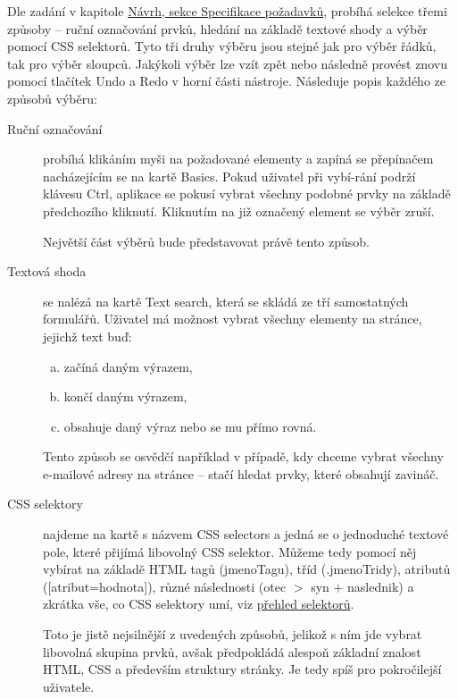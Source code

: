 \documentclass[thesis=B,czech]{FITthesis}[2012/06/26]
\begin{document}
Dle zadání v kapitole \hyperref[sec:requirements_specification]{Návrh, sekce Specifikace požadavků}, probíhá selekce třemi způsoby -- ruční označování prvků, hledání na základě textové shody a výběr pomocí CSS selektorů. Tyto tři druhy výběru jsou stejné jak pro výběr řádků, tak pro výběr sloupců. Jakýkoli výběr lze vzít zpět nebo následně provést znovu pomocí tlačítek \textsf{Undo} a \textsf{Redo} v horní části nástroje. Následuje popis každého ze způsobů výběru:
\begin{description}
	\item[Ruční označování] probíhá klikáním myši na požadované elementy a zapíná se přepínačem nacházejícím se na kartě \textsf{Basics}. Pokud uživatel při vybí-rání podrží klávesu \textsf{Ctrl}, aplikace se pokusí vybrat všechny podobné prvky na základě předchozího kliknutí. Kliknutím na již označený element se výběr zruší.
	
	Největší část výběrů bude představovat právě tento způsob.
	\item [Textová shoda] se nalézá na kartě \textsf{Text search}, která se skládá ze tří samostatných formulářů. Uživatel má možnost vybrat všechny elementy na stránce, jejichž text buď:
	\begin{enumerate}[a)]
		\item začíná daným výrazem,
		\item končí daným výrazem,
		\item obsahuje daný výraz nebo se mu přímo rovná.
	\end{enumerate}
	Tento způsob se osvědčí například v případě, kdy chceme vybrat všechny e-mailové adresy na stránce -- stačí hledat prvky, které obsahují zavináč.
	\item [CSS selektory] najdeme na kartě s názvem \textsf{CSS selectors} a jedná se o jednoduché textové pole, které přijímá libovolný CSS selektor. Můžeme tedy pomocí něj vybírat na základě HTML tagů (\textsf{jmenoTagu}), tříd (\textsf{.jmenoTridy}), atributů (\textsf{[atribut=hodnota]}), různé následnosti (\textsf{otec $>$ syn $+$ naslednik}) a zkrátka vše, co CSS selektory umí, viz \href{https://www.w3schools.com/cssref/css_selectors.asp}{přehled selektorů}.
	
	Toto je jistě nejsilnější z uvedených způsobů, jelikož s ním jde vybrat libovolná skupina prvků, avšak předpokládá alespoň základní znalost HTML, CSS a především struktury stránky. Je tedy spíš pro pokročilejší uživatele.
\end{description}
\vfill
\end{document}
